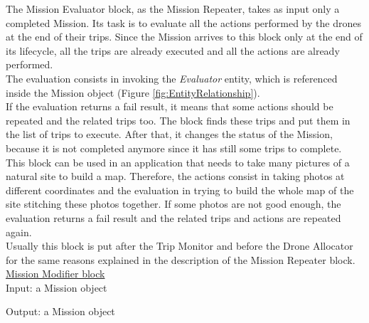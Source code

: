 The Mission Evaluator block, as the Mission Repeater, takes as input only a completed Mission.
Its task is to evaluate all the actions performed by the drones at the end of their trips.
Since the Mission arrives to this block only at the end of its lifecycle, all the trips are already executed and all the actions are already performed.
\\
The evaluation consists in invoking the \textit{Evaluator} entity, which is referenced inside the Mission object (Figure \ref{fig:EntityRelationship}).
\\
If the evaluation returns a fail result, it means that some actions should be repeated and the related trips too. 
The block finds these trips and put them in the list of trips to execute.
After that, it changes the status of the Mission, because it is not completed anymore since it has still some trips to complete.
\\
This block can be used in an application that needs to take many pictures of a natural site to build a map.
Therefore, the actions consist in taking photos at different coordinates and the evaluation in trying to build the whole map of the site stitching these photos together.
If some photos are not good enough, the evaluation returns a fail result and the related trips and actions are repeated again.
\\
Usually this block is put after the Trip Monitor and before the Drone Allocator for the same reasons explained in the description of the Mission Repeater block.
\\

\underline{Mission Modifier block}\label{missionModifier}
\\

Input: a Mission object

Output: a Mission object
\\


